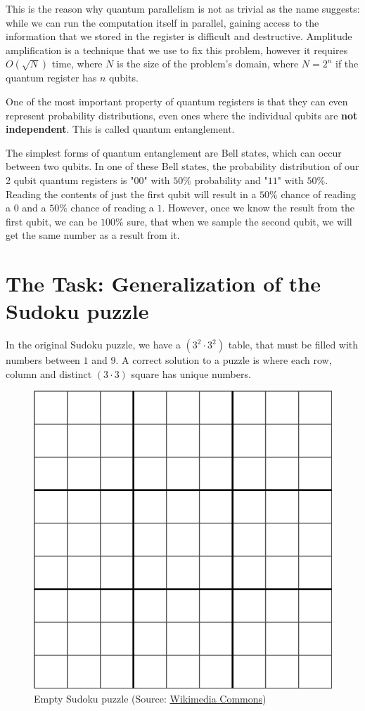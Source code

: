 This is the reason why quantum parallelism is not as trivial as the name suggests: while we can run the computation itself in parallel, gaining access to the information that we stored in the register is difficult and destructive. Amplitude amplification is a technique that we use to fix this problem, however it requires $O(\sqrt{N})$ time, where $N$ is the size of the problem's domain, where $N=2^n$ if the quantum register has $n$ qubits.

One of the most important property of quantum registers is that they can even represent probability distributions, even ones where the individual qubits are \textbf{not independent}. This is called quantum entanglement.

The simplest forms of quantum entanglement are Bell states, which can occur between two qubits. In one of these Bell states, the probability distribution of our 2 qubit quantum registers is "$00$" with $50\%$ probability and "$11$" with $50\%$. Reading the contents of just the first qubit will result in a $50\%$ chance of reading a $0$ and a $50\%$ chance of reading a $1$. However, once we know the result from the first qubit, we can be $100\%$ sure, that when we sample the second qubit, we will get the same number as a result from it.

\section{The Task: Generalization of the Sudoku puzzle}

In the original Sudoku puzzle, we have a $(3^2\cdot{}3^2)$ table, that must be filled with numbers between $1$ and $9$. A correct solution to a puzzle is where each row, column and distinct $(3\cdot{}3)$ square has unique numbers.

\begin{figure}[H]
    \centering
    \includegraphics[width=0.7\linewidth]{content/assets/03_grovers_algorithm/sudoku_3.png}
    \caption{Empty Sudoku puzzle (Source:  \href{https://en.wikipedia.org/wiki/File:Sudoku_Puzzle_by_L2G-20050714_standardized_layout.svg}{Wikimedia Commons})}
    \label{fig:my_label}
\end{figure}

